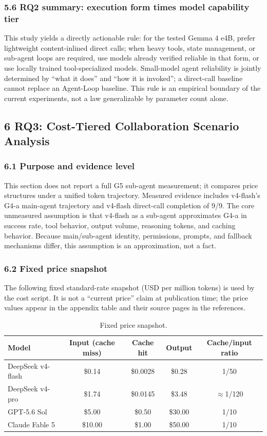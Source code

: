 \documentclass[
]{article}
\begin{document}
\subsubsection{5.6 RQ2 summary: execution form times model capability tier}
This study yields a directly actionable rule: for the tested Gemma 4 e4B, prefer lightweight content-inlined direct calls; when heavy tools, state management, or sub-agent loops are required, use models already verified reliable in that form, or use locally trained tool-specialized models. Small-model agent reliability is jointly determined by ``what it does'' and ``how it is invoked''; a direct-call baseline cannot replace an Agent-Loop baseline. This rule is an empirical boundary of the current experiments, not a law generalizable by parameter count alone.

\subsection{6 RQ3: Cost-Tiered Collaboration Scenario Analysis}
\subsubsection{6.1 Purpose and evidence level}
This section does not report a full G5 sub-agent measurement; it compares price structures under a unified token trajectory. Measured evidence includes v4-flash's G4-a main-agent trajectory and v4-flash direct-call completion of 9/9. The core unmeasured assumption is that v4-flash as a sub-agent approximates G4-a in success rate, tool behavior, output volume, reasoning tokens, and caching behavior. Because main/sub-agent identity, permissions, prompts, and fallback mechanisms differ, this assumption is an approximation, not a fact.

\subsubsection{6.2 Fixed price snapshot}
The following fixed standard-rate snapshot (USD per million tokens) is used by the cost script. It is not a ``current price'' claim at publication time; the price values appear in the appendix table and their source pages in the references.

\begin{table}[ht]
\centering
\small
\begin{tabular}{lcccc}
\toprule
Model & Input (cache miss) & Cache hit & Output & Cache/input ratio \\
\midrule
DeepSeek v4-flash & \$0.14 & \$0.0028 & \$0.28 & 1/50 \\
DeepSeek v4-pro & \$1.74 & \$0.0145 & \$3.48 & $\approx$1/120 \\
GPT-5.6 Sol & \$5.00 & \$0.50 & \$30.00 & 1/10 \\
Claude Fable 5 & \$10.00 & \$1.00 & \$50.00 & 1/10 \\
\bottomrule
\end{tabular}
\caption{Fixed price snapshot.}
\label{tab:price}
\end{table}
\end{document}
